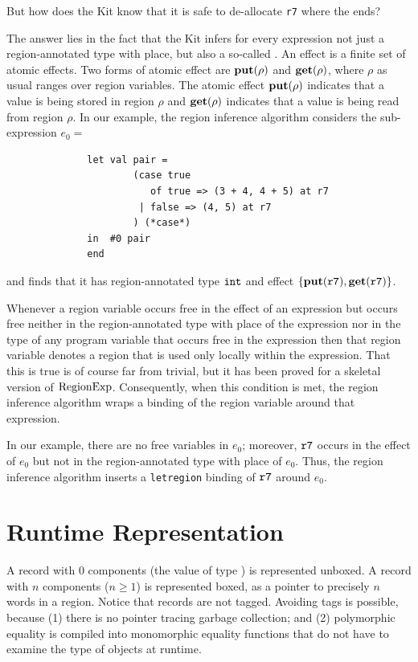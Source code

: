 \documentclass[12pt]{book}
\begin{document}
But how does the Kit know that it is safe to de-allocate {\tt r7}
where the  ends?

The answer lies in the fact that the Kit infers for every expression
not just a region-annotated type with place, but also a so-called . 
An effect is a finite set of 
atomic effects. Two forms of atomic
effect are $\mathop{\bf put}\nolimits(\rho)$ and $\mathop{\bf get}\nolimits(\rho)$, where $\rho$ as usual ranges
over region variables. The atomic effect $\mathop{\bf put}\nolimits(\rho)$ indicates that a value is being stored in
region $\rho$ and $\mathop{\bf get}\nolimits(\rho)$ indicates that a value is being read from region $\rho$.
In our example, the region inference algorithm considers the sub-expression $e_0 = $
\begin{verbatim}
              let val pair = 
                      (case true 
                         of true => (3 + 4, 4 + 5) at r7 
                       | false => (4, 5) at r7
                      ) (*case*) 
              in  #0 pair
              end  \end{verbatim}
and finds that it has region-annotated type $\hbox{\tt int}$ and effect
$\{\mathop{\bf put}\nolimits(\hbox{\tt r7}), \mathop{\bf get}\nolimits(\hbox{\tt r7})\}$.

Whenever a region variable occurs free in the effect of an expression but occurs
free neither in the region-annotated type with place of the expression nor in the type of any
program variable that occurs free in the expression then that region variable denotes
a region that is used only locally within the expression.  
That this is true is of course far from trivial, but it
has been proved for a skeletal version of $\hbox{\rm RegionExp}$.  Consequently, 
when this condition is met, the region inference
algorithm wraps a  binding of the region variable
around that expression.

In our example, there are no free variables in $e_0$; moreover, $\hbox{\tt r7}$
occurs in the effect of $e_0$ but not in the region-annotated type with place of $e_0$. Thus,
the region inference algorithm inserts a {\tt letregion} binding of $\hbox{\tt r7}$
around $e_0$.

\section{Runtime Representation}
A 
%
record with 0 components
(the value of type ) is represented
unboxed.  A record with $n$ components ($n\geq 1$) is represented
boxed, as a pointer to precisely $n$ words in a region.  Notice that
records are not tagged. Avoiding tags is possible, because (1) there
is no pointer tracing garbage collection; and (2)
polymorphic equality is compiled into
monomorphic equality functions that do not
have to examine the type of objects at runtime.
\end{document}
